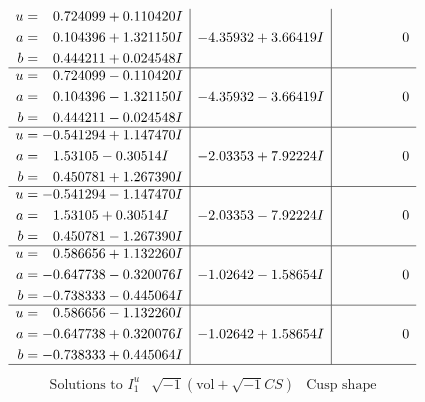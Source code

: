 \documentclass[1p]{elsarticle_modified}
\theoremstyle{definition}
\newcommand{\I}{\sqrt{-1}}
\begin{document}
$$\begin{array}{c|c|c}
\begin{aligned}
u &= \phantom{-}0.724099 + 0.110420 I \\
a &= \phantom{-}0.104396 + 1.321150 I \\
b &= \phantom{-}0.444211 + 0.024548 I\end{aligned}
 & -4.35932 + 3.66419 I & \phantom{-0.000000 } 0 \\ \hline\begin{aligned}
u &= \phantom{-}0.724099 - 0.110420 I \\
a &= \phantom{-}0.104396 - 1.321150 I \\
b &= \phantom{-}0.444211 - 0.024548 I\end{aligned}
 & -4.35932 - 3.66419 I & \phantom{-0.000000 } 0 \\ \hline\begin{aligned}
u &= -0.541294 + 1.147470 I \\
a &= \phantom{-}1.53105 - 0.30514 I \\
b &= \phantom{-}0.450781 + 1.267390 I\end{aligned}
 & -2.03353 + 7.92224 I & \phantom{-0.000000 } 0 \\ \hline\begin{aligned}
u &= -0.541294 - 1.147470 I \\
a &= \phantom{-}1.53105 + 0.30514 I \\
b &= \phantom{-}0.450781 - 1.267390 I\end{aligned}
 & -2.03353 - 7.92224 I & \phantom{-0.000000 } 0 \\ \hline\begin{aligned}
u &= \phantom{-}0.586656 + 1.132260 I \\
a &= -0.647738 - 0.320076 I \\
b &= -0.738333 - 0.445064 I\end{aligned}
 & -1.02642 - 1.58654 I & \phantom{-0.000000 } 0 \\ \hline\begin{aligned}
u &= \phantom{-}0.586656 - 1.132260 I \\
a &= -0.647738 + 0.320076 I \\
b &= -0.738333 + 0.445064 I\end{aligned}
 & -1.02642 + 1.58654 I & \phantom{-0.000000 } 0\\
 \hline 
 \end{array}$$\newpage$$\begin{array}{c|c|c}  
\text{Solutions to }I^u_{1}& \I (\text{vol} + \sqrt{-1}CS) & \text{Cusp shape}\\
 \hline 
\begin{aligned}

\end{aligned}
\end{array}$$
\end{document}
